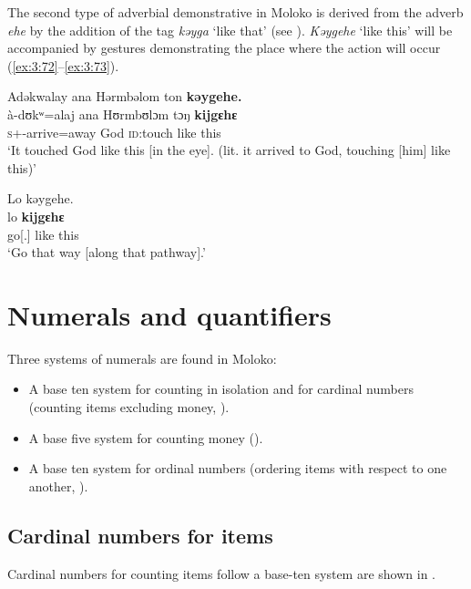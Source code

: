The second type of adverbial demonstrative in Moloko is derived from the adverb \textit{ehe} by the addition of the tag \textit{kəyga} ‘like that’ (see ). \textit{Kəygehe} ‘like this’ will be accompanied by gestures demonstrating the place where the action will occur (\ref{ex:3:72}--\ref{ex:3:73}). 

\ea \label{ex:3:72}
Adəkwalay  ana  Hərmbəlom  ton  \textbf{kəygehe.}\\
\gll  à-dʊkʷ=alaj  ana  Hʊrmbʊlɔm  tɔŋ    \textbf{kijgɛhɛ}\\
      \textsc{s}+{\PFV}-arrive=away  {\DAT} God    \textsc{id}:touch     {like this}\\
\glt  ‘It touched God like this [in the eye]. (lit. it arrived to God, touching [him] like this)’
\z

\ea \label{ex:3:73}
Lo  kəygehe.\\
\gll lo    \textbf{kijgɛhɛ}\\
      go[{\twoS}.{\IMP}]  {like this}\\
\glt  ‘Go that way [along that pathway].’
\z
{}

\section{Numerals and quantifiers}\label{sec:3.3}
\hypertarget{RefHeading1211021525720847}{}
Three systems of numerals are found in Moloko:

\begin{itemize}
\item A base ten system for counting in isolation and for cardinal numbers (counting items excluding money, ).
\item A base five system for counting money ().
\item A base ten system for ordinal numbers (ordering items with respect to one another, ). 
\end{itemize}
\subsection{Cardinal numbers for items}\label{sec:3.3.1}
\hypertarget{RefHeading1211041525720847}{}
Cardinal numbers for counting items follow a base-ten system are shown in .

